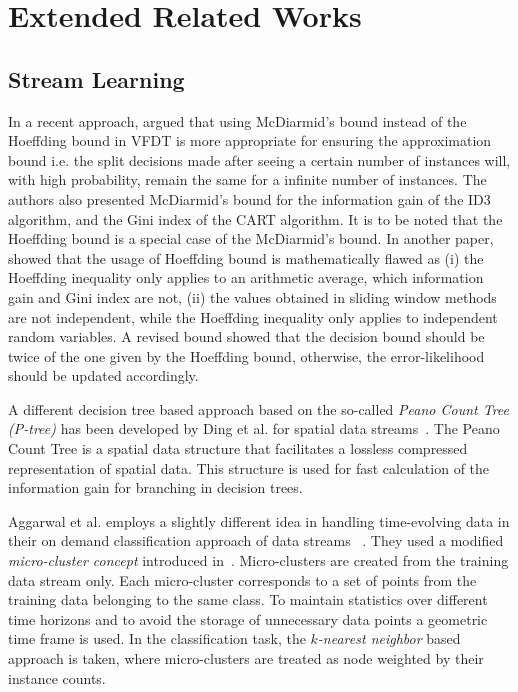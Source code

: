 \chapter{Extended Related Works}
\label{appndx:erw}
\section*{Stream Learning}
In a recent approach, \cite{rutkowski13:vfdt} argued that using McDiarmid’s bound instead of the Hoeffding bound in VFDT is more appropriate for ensuring the approximation bound i.e. the split decisions made after seeing a certain number of instances will, with high probability, remain the same for a infinite number of instances. The authors also presented McDiarmid’s bound for the  information gain of the ID3 algorithm, and the Gini index of the CART algorithm. It is to be noted that the Hoeffding bound is a special case of the McDiarmid’s bound. In another paper, \cite{matuszyk:vfdt} showed that the usage of Hoeffding bound is mathematically flawed as (i) the Hoeffding inequality only applies to an arithmetic average, which information gain and Gini index are not, (ii) the values obtained in sliding window methods are not independent, while the Hoeffding inequality only applies to independent random variables. A revised bound showed that the decision bound should be twice of the one given by the Hoeffding bound, otherwise,  the error-likelihood should be updated accordingly.


A different decision tree based approach based on the so-called \textit{Peano Count Tree (P-tree)} has been developed by Ding et al. for spatial data streams~\cite{ding02:peanocount}. The Peano Count Tree is a spatial data structure that facilitates a lossless compressed representation of spatial data. This structure is used for fast calculation of the information gain for branching in decision trees.

Aggarwal et al. employs a slightly different idea in handling time-evolving data in their on demand classification approach of data streams ~\cite{aggarwal04:ondemand}. They used a modified \textit{micro-cluster concept} introduced in~\cite{aggarwal03:clustream}. Micro-clusters are created from the training data stream only. Each micro-cluster corresponds to a set of points from the training data belonging to the same class. To maintain statistics over different time horizons and to avoid the storage of unnecessary data points a geometric time frame is used. In the classification task, the \textit{$k$-nearest neighbor} based approach is taken, where micro-clusters are treated as node weighted by their instance counts. 

